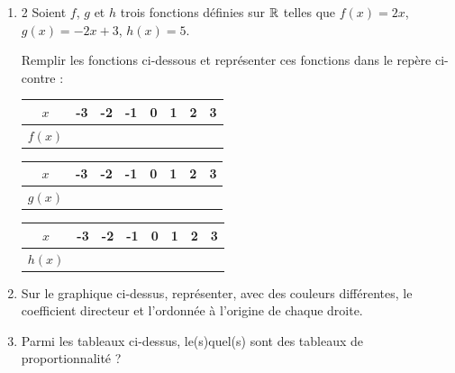 \documentclass[10pt,a4paper]{article}
\begin{document}
\begin{exo}
\begin{enumerate}
    \item
\begin{multicols}{2}
Soient $f$, $g$ et $h$ trois fonctions définies sur $\mathbb{R}$ telles que $f(x)=2x$, $g(x)=-2x+3$, $h(x)=5$.

Remplir les fonctions ci-dessous et représenter ces fonctions dans le repère ci-contre :

 \setlength{\tabcolsep}{10pt}
\renewcommand{\arraystretch}{1.5}
\begin{tabular}{|c|c|c|c|c|c|c|c|}
\hline
$x$ & -3 & -2 & -1 & 0 & 1 & 2 & 3 \\
\hline
$f(x)$&  &    &    &   &   &   &   \\
\hline
\end{tabular}

\begin{tabular}{|c|c|c|c|c|c|c|c|}
\hline
$x$ & -3 & -2 & -1 & 0 & 1 & 2 & 3 \\
\hline
$g(x)$&  &    &    &   &   &   &   \\
\hline
\end{tabular}

\begin{tabular}{|c|c|c|c|c|c|c|c|}
\hline
$x$ & -3 & -2 & -1 & 0 & 1 & 2 & 3 \\
\hline
$h(x)$&  &    &    &   &   &   &   \\
\hline
\end{tabular}

\end{multicols}

\item Sur le graphique ci-dessus, représenter, avec des couleurs différentes, le coefficient directeur et l'ordonnée à l'origine de chaque droite.

\item Parmi les tableaux ci-dessus, le(s)quel(s) sont des tableaux de proportionnalité ?

 \end{enumerate}
\end{exo}
\end{document}
